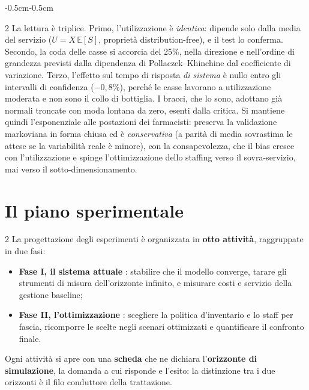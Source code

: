 \documentclass{article}
\begin{document}
\begin{adjustwidth}{-0.5cm}{-0.5cm}
\begin{multicols}{2}
La lettura è triplice. Primo, l'utilizzazione è \emph{identica}: dipende solo dalla media del
servizio ($U = X\,\mathbb{E}[S]$, proprietà distribution-free), e il test lo conferma. Secondo, la coda delle casse si accorcia del 25\%, nella
direzione e nell'ordine di grandezza previsti dalla dipendenza di Pollaczek--Khinchine dal
coefficiente di variazione. Terzo, l'effetto
sul tempo di risposta \emph{di sistema} è nullo entro gli intervalli di confidenza ($-0{,}8\%$),
perché le casse lavorano a utilizzazione moderata e non sono il collo di bottiglia. I bracci,
che lo sono, adottano già normali troncate con moda lontana da zero, esenti dalla critica. Si
mantiene quindi l'esponenziale alle postazioni dei farmacisti: preserva la validazione markoviana in forma chiusa ed è
\emph{conservativa} (a parità di media sovrastima le attese se la variabilità reale è minore), con
la consapevolezza, che il bias cresce con l'utilizzazione e spinge
l'ottimizzazione dello staffing verso il sovra-servizio, mai verso il sotto-dimensionamento.
\end{multicols}

\newpage
\section{Il piano sperimentale}
\begin{multicols}{2}
La progettazione degli esperimenti è organizzata in \textbf{otto attività}, raggruppate in due fasi:
\begin{itemize}
    \item[\ding{112}] \textbf{Fase I,  il sistema attuale }: stabilire che il
    modello converge, tarare gli strumenti di misura dell'orizzonte infinito, e misurare costi e
    servizio della gestione baseline;
    \item[\ding{112}] \textbf{Fase II,  l'ottimizzazione }: scegliere la politica
    d'inventario e lo staff per fascia, ricomporre le scelte negli scenari ottimizzati e
    quantificare il confronto finale.
\end{itemize}
Ogni attività si apre con una \textbf{scheda} che ne dichiara l'\textbf{orizzonte di simulazione},
la domanda a cui risponde e l'esito: la distinzione tra i due orizzonti è il filo conduttore della trattazione.


\end{multicols}
\end{adjustwidth}
\end{document}
